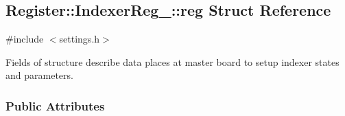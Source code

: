 \hypertarget{structRegister_1_1IndexerReg___1_1reg}{}\subsection{Register\+:\+:Indexer\+Reg\+\_\+\+:\+:reg Struct Reference}
\label{structRegister_1_1IndexerReg___1_1reg}

{\ttfamily \#include $<$settings.\+h$>$}

Fields of structure describe data places at master board to setup indexer states and parameters.

\subsubsection*{Public Attributes}
